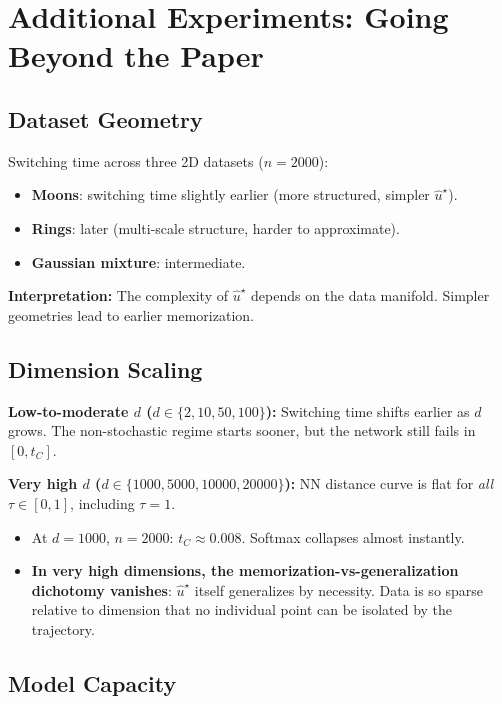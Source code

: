 \documentclass[11pt, a4paper]{article}
\theoremstyle{plain}
\theoremstyle{definition}
\theoremstyle{remark}
\begin{document}
\section{Additional Experiments: Going Beyond the Paper}
\label{sec:additional}

\subsection{Dataset Geometry}

Switching time across three 2D datasets ($n=2000$):
\begin{itemize}
  \item \textbf{Moons}: switching time slightly earlier (more structured, simpler $\hat{u}^\star$).
  \item \textbf{Rings}: later (multi-scale structure, harder to approximate).
  \item \textbf{Gaussian mixture}: intermediate.
\end{itemize}
\textbf{Interpretation:} The complexity of $\hat{u}^\star$ depends on the data manifold. Simpler geometries lead to earlier memorization.

\subsection{Dimension Scaling}

\textbf{Low-to-moderate $d$ ($d \in \{2, 10, 50, 100\}$):} Switching time shifts earlier as $d$ grows. The non-stochastic regime starts sooner, but the network still fails in $[0, t_C]$.

\textbf{Very high $d$ ($d \in \{1000, 5000, 10000, 20000\}$):} NN distance curve is flat for \emph{all} $\tau \in [0,1]$, including $\tau=1$.
\begin{itemize}
  \item At $d=1000$, $n=2000$: $t_C \approx 0.008$. Softmax collapses almost instantly.
  \item \textbf{In very high dimensions, the memorization-vs-generalization dichotomy vanishes}: $\hat{u}^\star$ itself generalizes by necessity. Data is so sparse relative to dimension that no individual point can be isolated by the trajectory.
\end{itemize}

\subsection{Model Capacity}
\end{document}
